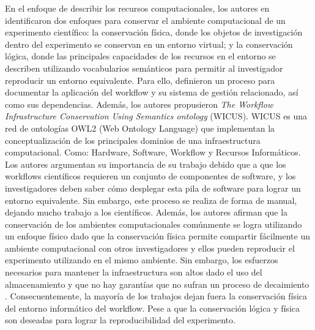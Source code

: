 En el enfoque de describir los recursos computacionales, los autores en \cite{santana2017reproducibility} identificaron dos enfoques para conservar el  ambiente computacional de un experimento científico: la conservación física, donde los objetos de investigación dentro del experimento se conservan en un entorno virtual; y la conservación lógica, donde las principales capacidades de los recursos en el entorno se describen utilizando vocabularios semánticos para permitir al investigador reproducir un entorno equivalente.
Para ello, definieron un proceso para documentar la aplicación del workflow y su sistema de gestión relacionado, así como sus dependencias.
Además, los autores propusieron \textit{The Workflow Infrastructure Conservation Using Semantics ontology} (WICUS). WICUS es una red de ontologías OWL2 (Web Ontology Language) que implementan la conceptualización de los principales dominios de una infraestructura computacional. Como: Hardware, Software, Workflow y Recursos Informáticos. 
Los autores argumentan su importancia de su trabajo debido que a que los workflows científicos requieren un conjunto de componentes de software, y los investigadores deben saber cómo desplegar esta pila de software para lograr un entorno equivalente.
Sin embargo, este proceso se realiza de forma de manual, dejando mucho trabajo a los científicos.
Además, los autores afirman que la conservación de los ambientes computacionales comúnmente se logra utilizando un enfoque físico dado que la conservación física permite compartir fácilmente un ambiente computacional con otros investigadores y ellos pueden reproducir el experimento utilizando en el mismo ambiente. 
Sin embargo, los esfuerzos necesarios para mantener la infraestructura son altos dado el uso del almacenamiento y que no hay garantías que no sufran un proceso de decaimiento \cite{DBLP:journals/fgcs/DeelmanVJRCMMCS15}.  
Consecuentemente, la mayoría de los trabajos dejan fuera la conservación física del entorno informático del workflow. Pese a que la conservación lógica y física son deseadas para lograr la reproducibilidad del experimento.

